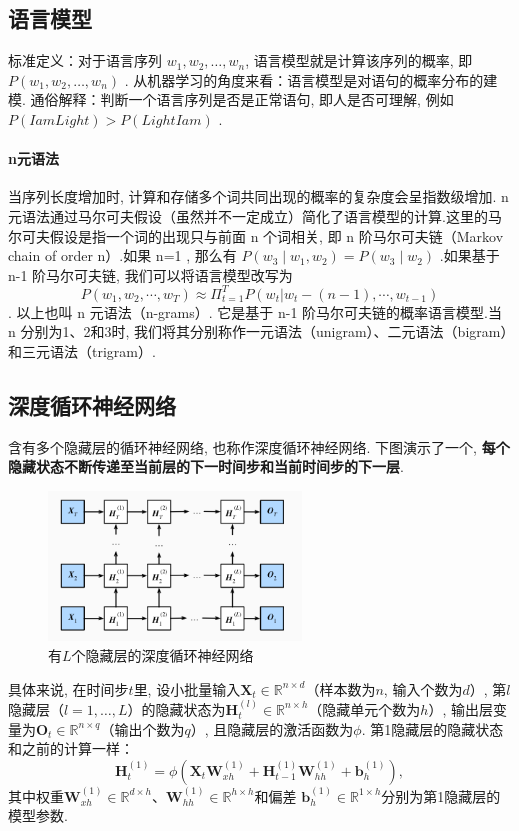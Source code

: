 \documentclass[a4paper]{article}
\theoremstyle{definition}
\numberwithin{equation}{section}
\begin{document}
\subsection{语言模型}

标准定义：对于语言序列 $w_1, w_2, \dots,  w_n$, 语言模型就是计算该序列的概率, 即 $P(w_1, w_2,  \dots,  w_n)$ .
从机器学习的角度来看：语言模型是对语句的概率分布的建模.
通俗解释：判断一个语言序列是否是正常语句, 即人是否可理解, 例如 $P(I am Light) > P(Light I am)$ .
\paragraph{n元语法}

当序列长度增加时, 计算和存储多个词共同出现的概率的复杂度会呈指数级增加. n 元语法通过马尔可夫假设（虽然并不一定成立）简化了语言模型的计算.这里的马尔可夫假设是指一个词的出现只与前面 n 个词相关, 即 n 阶马尔可夫链（Markov chain of order n）.如果 n=1 , 那么有 $P(w_3∣w_1, w_2)=P(w_3∣w_2)$ .如果基于 n-1 阶马尔可夫链, 我们可以将语言模型改写为
$$P(w_1, w_2, \cdots , w_T) \approx \Pi_{t=1}^T P(w_t|w_t-(n-1), \cdots, w_{t-1})$$.
以上也叫 n 元语法（n-grams）. 它是基于 n-1 阶马尔可夫链的概率语言模型.当 n 分别为1、2和3时, 我们将其分别称作一元语法（unigram）、二元语法（bigram）和三元语法（trigram）.

\subsection{深度循环神经网络}
含有多个隐藏层的循环神经网络, 也称作深度循环神经网络. 下图演示了一个, \textbf{每个隐藏状态不断传递至当前层的下一时间步和当前时间步的下一层}. 

 \begin{figure}[!htb]
    \center
\includegraphics[width=0.6\textwidth]{deep_rnn.png}
\caption{有$L$个隐藏层的深度循环神经网络}
\end{figure}
 

具体来说, 在时间步$t$里, 设小批量输入$\mathbf{X}_t \in \mathbb{R}^{n \times d}$（样本数为$n$, 输入个数为$d$）, 第$l$隐藏层（$l=1, \ldots, L$）的隐藏状态为$\mathbf{H}_t^{(l)}  \in \mathbb{R}^{n \times h}$（隐藏单元个数为$h$）, 输出层变量为$\mathbf{O}_t \in \mathbb{R}^{n \times q}$（输出个数为$q$）, 且隐藏层的激活函数为$\phi$. 第1隐藏层的隐藏状态和之前的计算一样：
$$\mathbf{H}_t^{(1)} = \phi(\mathbf{X}_t \mathbf{W}_{xh}^{(1)} + \mathbf{H}_{t-1}^{(1)} \mathbf{W}_{hh}^{(1)}  + \mathbf{b}_h^{(1)}), $$
其中权重$\mathbf{W}_{xh}^{(1)} \in \mathbb{R}^{d \times h}$、$\mathbf{W}_{hh}^{(1)} \in \mathbb{R}^{h \times h}$和偏差 $\mathbf{b}_h^{(1)} \in \mathbb{R}^{1 \times h}$分别为第1隐藏层的模型参数. 
\end{document}
